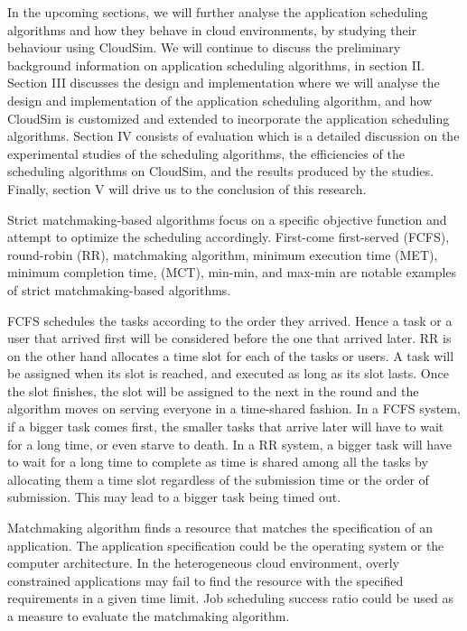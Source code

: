 \documentclass[times, 10pt,twocolumn]{article}
\begin{document}
In the upcoming sections, we will further analyse the application scheduling algorithms and how they behave in cloud environments, by studying their behaviour using CloudSim. We will continue to discuss the preliminary background information on application scheduling algorithms, in section II. Section III discusses the design and implementation where we will analyse the design and implementation of the application scheduling algorithm, and how CloudSim is customized and extended to incorporate the application scheduling algorithms. Section IV consists of evaluation which is a detailed discussion on the experimental studies of the scheduling algorithms, the efficiencies of the scheduling algorithms on CloudSim, and the results produced by the studies. Finally, section V will drive us to the conclusion of this research.

Strict matchmaking-based algorithms focus on a specific objective function and attempt to optimize the scheduling accordingly. First-come first-served (FCFS), round-robin (RR), matchmaking algorithm, minimum execution time (MET), minimum completion time, (MCT), min-min, and max-min\cite{heuristics} are notable examples of strict matchmaking-based algorithms. 

FCFS schedules the tasks according to the order they arrived. Hence a task or a user that arrived first will be considered before the one that arrived later. RR is on the other hand allocates a time slot for each of the tasks or users. A task will be assigned when its slot is reached, and executed as long as its slot lasts. Once the slot finishes, the slot will be assigned to the next in the round and the algorithm moves on serving everyone in a time-shared fashion. In a FCFS system, if a bigger task comes first, the smaller tasks that arrive later will have to wait for a long time, or even starve to death. In a RR system, a bigger task will have to wait for a long time to complete as time is shared among all the tasks by allocating them a time slot regardless of the submission time or the order of submission. This may lead to a bigger task being timed out.

Matchmaking algorithm finds a resource that matches the specification of an application. The application specification could be the operating system or the computer architecture. In the heterogeneous cloud environment, overly constrained applications may fail to find the resource with the specified requirements in a given time limit. Job scheduling success ratio could be used as a measure to evaluate the matchmaking algorithm. 
\end{document}
